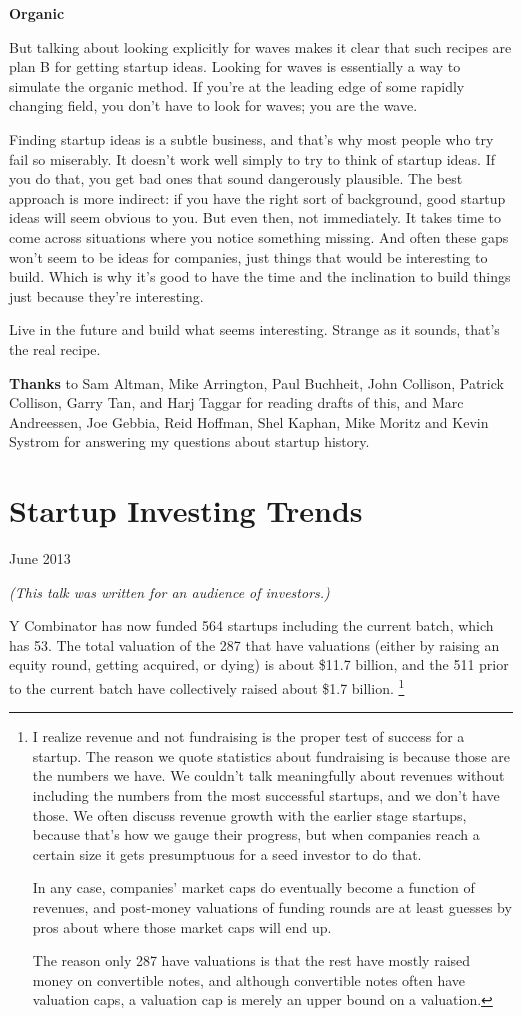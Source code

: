 \documentclass[12pt]{book}
\begin{document}
\textbf{Organic}

But talking about looking explicitly for waves makes it clear that such
recipes are plan B for getting startup ideas. Looking for waves is
essentially a way to simulate the organic method. If you're at the
leading edge of some rapidly changing field, you don't have to look for
waves; you are the wave.

Finding startup ideas is a subtle business, and that's why most people
who try fail so miserably. It doesn't work well simply to try to think
of startup ideas. If you do that, you get bad ones that sound
dangerously plausible. The best approach is more indirect: if you have
the right sort of background, good startup ideas will seem obvious to
you. But even then, not immediately. It takes time to come across
situations where you notice something missing. And often these gaps
won't seem to be ideas for companies, just things that would be
interesting to build. Which is why it's good to have the time and the
inclination to build things just because they're interesting.

Live in the future and build what seems interesting. Strange as it
sounds, that's the real recipe.


\textbf{Thanks} to Sam Altman, Mike Arrington, Paul Buchheit, John
Collison, Patrick Collison, Garry Tan, and Harj Taggar for reading
drafts of this, and Marc Andreessen, Joe Gebbia, Reid Hoffman, Shel
Kaphan, Mike Moritz and Kevin Systrom for answering my questions about
startup history.
\chapter{Startup Investing Trends}

June 2013

\emph{(This talk was written for an audience of investors.)}

Y Combinator has now funded 564 startups including the current batch,
which has 53. The total valuation of the 287 that have valuations
(either by raising an equity round, getting acquired, or dying) is about
\$11.7 billion, and the 511 prior to the current batch have collectively
raised about \$1.7 billion. \footnote{I realize revenue and not fundraising is the proper test of
success for a startup. The reason we quote statistics about fundraising
is because those are the numbers we have. We couldn't talk meaningfully
about revenues without including the numbers from the most successful
startups, and we don't have those. We often discuss revenue growth with
the earlier stage startups, because that's how we gauge their progress,
but when companies reach a certain size it gets presumptuous for a seed
investor to do that.

In any case, companies' market caps do eventually become a function of
revenues, and post-money valuations of funding rounds are at least
guesses by pros about where those market caps will end up.

The reason only 287 have valuations is that the rest have mostly raised
money on convertible notes, and although convertible notes often have
valuation caps, a valuation cap is merely an upper bound on a valuation.}
\end{document}
